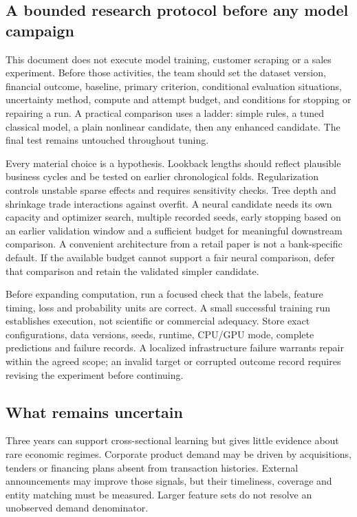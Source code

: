 \subsection{A bounded research protocol before any model campaign}

This document does not execute model training, customer scraping or a sales experiment. Before those activities, the team should set the dataset version, financial outcome, baseline, primary criterion, conditional evaluation situations, uncertainty method, compute and attempt budget, and conditions for stopping or repairing a run. A practical comparison uses a ladder: simple rules, a tuned classical model, a plain nonlinear candidate, then any enhanced candidate. The final test remains untouched throughout tuning.

Every material choice is a hypothesis. Lookback lengths should reflect plausible business cycles and be tested on earlier chronological folds. Regularization controls unstable sparse effects and requires sensitivity checks. Tree depth and shrinkage trade interactions against overfit. A neural candidate needs its own capacity and optimizer search, multiple recorded seeds, early stopping based on an earlier validation window and a sufficient budget for meaningful downstream comparison. A convenient architecture from a retail paper is not a bank-specific default. If the available budget cannot support a fair neural comparison, defer that comparison and retain the validated simpler candidate.

Before expanding computation, run a focused check that the labels, feature timing, loss and probability units are correct. A small successful training run establishes execution, not scientific or commercial adequacy. Store exact configurations, data versions, seeds, runtime, CPU/GPU mode, complete predictions and failure records. A localized infrastructure failure warrants repair within the agreed scope; an invalid target or corrupted outcome record requires revising the experiment before continuing.

\subsection{What remains uncertain}

Three years can support cross-sectional learning but gives little evidence about rare economic regimes. Corporate product demand may be driven by acquisitions, tenders or financing plans absent from transaction histories. External announcements may improve those signals, but their timeliness, coverage and entity matching must be measured. Larger feature sets do not resolve an unobserved demand denominator.

